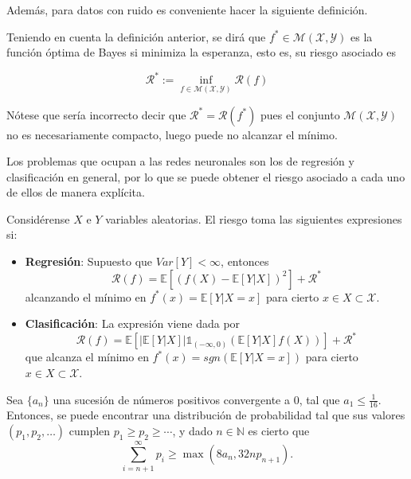 Además, para datos con ruido es conveniente hacer la siguiente definición.

\begin{definicion} 

Teniendo en cuenta la definición anterior, se dirá que $f^{*} \in \mathcal{M(X,Y)}$ es la función óptima de Bayes si minimiza la esperanza, esto es, su riesgo asociado es

$$\mathcal{R}^{*}:= \inf_{f \in \mathcal{M(X,Y)}} \mathcal{R}(f)$$

Nótese que sería incorrecto decir que $\mathcal{R}^{*}=\mathcal{R}(f^{*})$ pues el conjunto $\mathcal{M(X,Y)}$ no es necesariamente compacto, luego puede no alcanzar el mínimo.

\end{definicion}

Los problemas que ocupan a las redes neuronales son los de regresión y clasificación en general, por lo que se puede obtener el riesgo asociado a cada uno de ellos de manera explícita.

\begin{lema}
Considérense $X$ e $Y$ variables aleatorias. El riesgo toma las siguientes expresiones si:
\begin{itemize}
	\item \textbf{Regresión}: Supuesto que $Var[Y] < \infty$, entonces
$$\mathcal{R}(f)=\mathbb{E}[(f(X)-\mathbb{E}[Y|X])^{2}] + \mathcal{R}^{*}$$
alcanzando el mínimo en $f^{*}(x)=\mathbb{E}[Y|X=x]$ para cierto $x \in X \subset \mathcal{X}$.
	\item \textbf{Clasificación}: La expresión viene dada por 
	$$\mathcal{R}(f) = \mathbb{E}[ \left| \mathbb{E}[Y|X] \right| \mathbb{1}_{(-\infty,0)}\left(\mathbb{E}[Y|X]f(X)\right) ] + \mathcal{R}^{*}$$ que alcanza el mínimo en $f^{*}(x)=sgn(\mathbb{E}[Y|X=x])$ para cierto $x \in X \subset \mathcal{X}$.
\end{itemize}
\end{lema}

\begin{lema}\label{lemaNFL}
Sea $\{a_n\}$ una sucesión de números positivos convergente a $0$, tal que $a_1 \leq \frac{1}{16}$. Entonces, se puede encontrar una distribución de probabilidad tal que sus valores $(p_1, p_2, \ldots)$ cumplen $p_1 \geq p_2 \geq \cdots$, y dado $n \in \mathbb{N}$ es cierto que
$$\sum_{i=n+1}^{\infty} p_i \geq \max(8a_n, 32np_{n+1}).$$

\end{lema}

